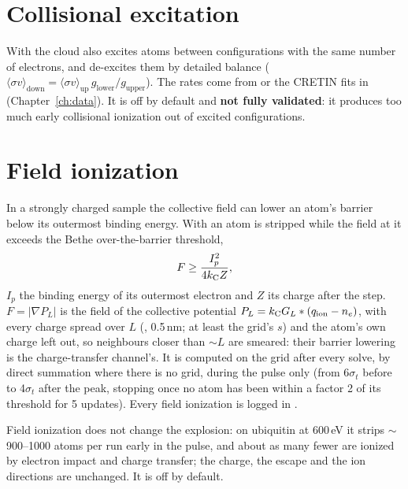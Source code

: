\section{Collisional excitation}

With  the cloud also excites atoms between configurations with the same number of
electrons, and de-excites them by detailed balance ($\langle\sigma v\rangle_{\mathrm{down}} =
\langle\sigma v\rangle_{\mathrm{up}}\,g_{\mathrm{lower}}/g_{\mathrm{upper}}$).
The rates come from  or the CRETIN  fits in
 (Chapter~\ref{ch:data}).
It is off by default and \textbf{not fully validated}: it produces too much early collisional ionization out of excited
configurations.

\section{Field ionization}

In a strongly charged sample the collective field can lower an atom's barrier below its outermost binding energy.
With  an atom is stripped while the field at it exceeds the Bethe over-the-barrier
threshold,
\begin{equation}
  F \ge \frac{I_p^2}{4k_{\mathrm C} Z},
\end{equation}
$I_p$ the binding energy of its outermost electron and $Z$ its charge after the step.
$F = |\nabla P_L|$ is the field of the collective potential $P_L = k_{\mathrm C} G_L*(q_{\mathrm{ion}}-n_e)$, with every
charge spread over $L$ (, 0.5\,nm; at least the grid's $s$) and the atom's own
charge left out, so neighbours closer than $\sim L$ are smeared: their barrier lowering is the charge-transfer
channel's.
It is computed on the grid after every solve, by direct summation where there is no grid, during the pulse only
(from 6$\sigma_t$ before to 4$\sigma_t$ after the peak, stopping once no atom has been within a factor 2 of its
threshold for 5 updates).
Every field ionization is logged in .

Field ionization does not change the explosion: on ubiquitin at 600\,eV it strips $\sim$900--1000 atoms per run early in
the pulse, and about as many fewer are ionized by electron impact and charge transfer; the charge, the escape and the
ion directions are unchanged.
It is off by default.
